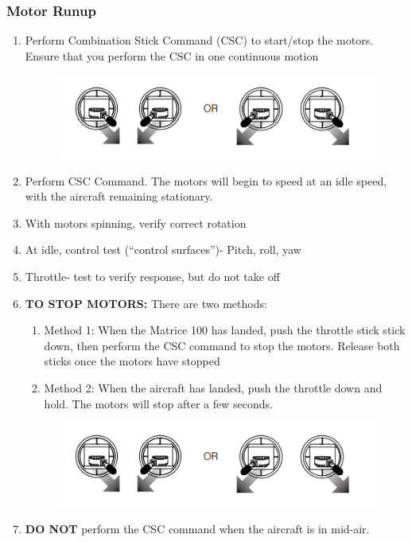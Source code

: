 \subsubsection{Motor Runup}
\begin{enumerate}
\setlength{\itemsep}{0em}
\setlength{\parskip}{0em}
\item Perform Combination Stick Command (CSC) to start/stop the motors. Ensure that you perform the CSC in one continuous motion
\begin{figure}[h]
\begin{center}
\includegraphics[width=0.7\columnwidth]{figures/op5.png}
\end{center}
\end{figure}  
\item Perform CSC Command. The motors will begin to speed at an idle speed, with the aircraft remaining stationary. 
\item With motors spinning, verify correct rotation
\item At idle, control test (``control surfaces'')- Pitch, roll, yaw
\item Throttle- test to verify response, but do not take off 
\item \textbf{TO STOP MOTORS:} There are two methods:
\begin{enumerate}
\setlength{\itemsep}{0em}
\setlength{\parskip}{0em}
\item Method 1: When the Matrice 100 has landed, push the throttle stick stick down, then perform the CSC command to stop the motors. Release both sticks once the motors have stopped
\item Method 2: When the aircraft has landed, push the throttle down and hold. The motors will stop after a few seconds. 
\end{enumerate}
\begin{figure}[h]
\begin{center}
\includegraphics[width=\columnwidth]{figures/op5.png}
\end{center}
\end{figure}   
\item \textbf{DO NOT} perform the CSC command when the aircraft is in mid-air. 
\end{enumerate}

